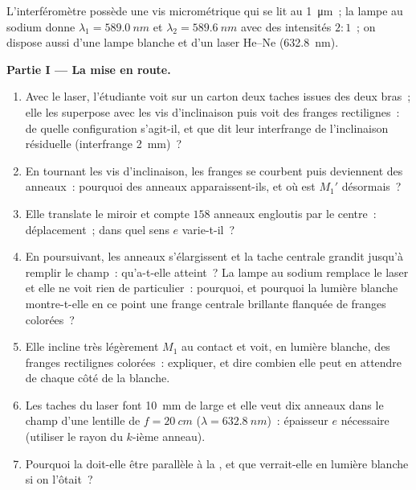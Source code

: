 \begin{problem}
\label{pb:b2:michelson:1}

L'interféromètre possède une vis micrométrique qui se lit au \qty{1}{\micro m}~; la
lampe au sodium donne $\lambda_1 = \qty{589.0}{nm}$ et $\lambda_2 = \qty{589.6}{nm}$ avec des
intensités $2 : 1$~; on dispose aussi d'une lampe blanche et d'un laser He--Ne (\qty{632.8}{nm}).

\medskip
\noindent\textbf{Partie I --- La mise en route.}
\begin{enumerate}
  \item Avec le laser, l'étudiante voit sur un carton deux taches issues des deux bras~;
        elle les superpose avec les vis d'inclinaison puis voit
        des franges rectilignes~: de quelle configuration s'agit-il, et que dit
        leur interfrange de l'inclinaison résiduelle (interfrange \qty{2}{mm})~?
  \item En tournant les vis d'inclinaison, les franges se courbent puis deviennent
        des anneaux~: pourquoi des anneaux apparaissent-ils, et où est $M_1'$ désormais~?
  \item Elle translate le miroir et compte $158$ anneaux engloutis par
        le centre~: déplacement~; dans quel sens $e$ varie-t-il~?
  \item En poursuivant, les anneaux s'élargissent et la tache centrale grandit
        jusqu'à remplir le champ~: qu'a-t-elle atteint~? La lampe au sodium
        remplace le laser et elle ne voit rien de particulier~: pourquoi, et
        pourquoi la lumière blanche montre-t-elle en ce point une frange centrale brillante flanquée de
        franges colorées~?
  \item Elle incline très légèrement $M_1$ au contact et voit, en lumière
        blanche, des franges rectilignes colorées~: expliquer, et dire combien
        elle peut en attendre de chaque côté de la blanche.
  \item Les taches du laser font \qty{10}{mm} de large et elle veut dix anneaux
        dans le champ d'une lentille de $f = \qty{20}{cm}$ ($\lambda = \qty{632.8}{nm}$)~:
        épaisseur $e$ nécessaire (utiliser le rayon du $k$-ième anneau).
  \item Pourquoi la  doit-elle être parallèle à la ,
        et que verrait-elle en lumière blanche si on l'ôtait~?
\end{enumerate}


\end{problem}

